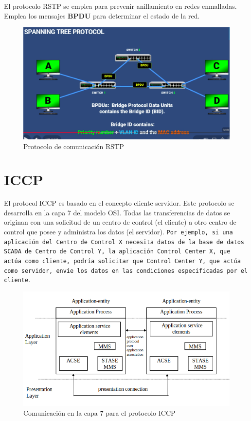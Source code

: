 \documentclass[a5paper]{book}%
\begin{document}
El protocolo RSTP se emplea para prevenir anillamiento en redes enmalladas. Emplea los mensajes \textbf{BPDU} para determinar el estado de la red.

\begin{figure}[H]
  \caption{Protocolo de comunicación RSTP}
  \label{fig:rsptp}
  \includegraphics[width=\linewidth]{rstp}
\end{figure}


\section{ICCP}

El protocol ICCP  es basado en el concepto cliente servidor. Este protocolo se desarrolla en la capa 7 del modelo OSI. Todas las transferencias de datos se originan con una solicitud de un centro de control (el cliente) a otro centro de control que posee y administra los datos (el servidor). \texttt{Por ejemplo, si una aplicación del Centro de Control X necesita datos de la base de datos SCADA de Centro de Control Y, la aplicación Control Center X, que actúa como cliente, podría solicitar que Control Center Y, que actúa como servidor, envíe los datos en las condiciones especificadas por el cliente}.\\

\begin{figure}[H]
  \caption{Comunicación en la capa 7 para el protocolo ICCP}
  \label{fig:capa7iccp}
  \includegraphics[width=\linewidth]{capas_iccp}
\end{figure}
\end{document}
